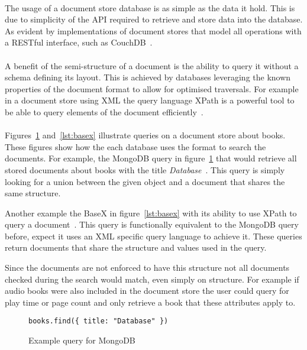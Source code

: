 \documentclass{CRPITStyle}
\renewcommand{\cite}{\citep}
\begin{document}
\paragraph{}
The usage of a document store database is as simple as the data it hold.
This is due to simplicity of the API required to retrieve and store data into
the database.
As evident by implementations of document stores that model all operations
with a RESTful interface, such as CouchDB~\cite{couchdb}.

\paragraph{}
A benefit of the semi-structure of a document is the ability to query it
without a schema defining its layout.
This is achieved by databases leveraging the known properties of the
document format to allow for optimised traversals.
For example in a document store using XML the query language XPath is a
powerful tool to be able to query elements of the document
efficiently~\cite{xpath}.

\paragraph{}
Figures~\ref{lst:mongo} and~\ref{lst:basex} illustrate queries on a document
store about books.
These figures show how the each database uses the format to search
the documents.
For example, the MongoDB query in figure~\ref{lst:mongo} that would retrieve all
stored documents about books with the title
\textit{Database}~\cite{nosql_db}.
This query is simply looking for a union between the given object and a
document that shares the same structure.

Another example the BaseX in figure~\ref{lst:basex} with its
ability to use XPath to query a document~\cite{basex}.
This query is functionally equivalent to the MongoDB query before, expect it uses
an XML specific query language to achieve it.
These queries return documents that share the structure and values used in the
query.

Since the documents are not enforced to have this structure not all documents
checked during the search would match, even simply on structure.
For example if audio books were also included in the document store the user
could query for play time or page count and only retrieve a book that these
attributes apply to.

\begin{figure}
\begin{verbatim}
books.find({ title: "Database" })
\end{verbatim}
\caption{Example query for MongoDB}
\label{lst:mongo}
\end{figure}
\end{document}
